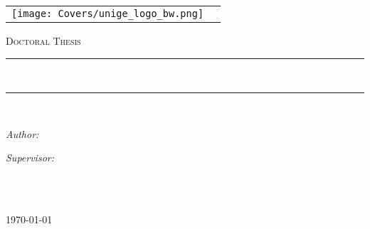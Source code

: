 \begin{titlepage}
\addtocounter{page}{-1}
\begin{center}

\begin{tabular}{cc}
    \texttt{[image: Covers/unige\_logo\_bw.png]} &  
    {\scshape \huge \darkred{\univname}} %
\end{tabular}

\vspace{0.5cm}
\textsc{\Large Doctoral Thesis}\\[0.5cm] %


\rule[0.4cm]{13cm}{0.1pt}\\%
{\huge \bfseries \ttitle\par}\vspace{0.4cm} %
\rule{13cm}{0.1pt}\\ \vspace{1.5cm}
 
\begin{minipage}[t]{0.4\textwidth}
\begin{flushleft} \large
\emph{Author:}\\
\href{http://#}{\authorname} %
\end{flushleft}
\end{minipage}
\begin{minipage}[t]{0.4\textwidth}
\begin{flushright} \large
\emph{Supervisor:} \\
\href{https://www.iit.it/people/tommaso-fellin}{\supname} \\ %
\end{flushright}
\end{minipage}\\[1.6cm]
 
\vfill

 
\vfill

{\large \usdate\today}\\[4cm] %
 
\vfill
\end{center}

\end{titlepage}


\blankpage
\addtocounter{page}{-1}